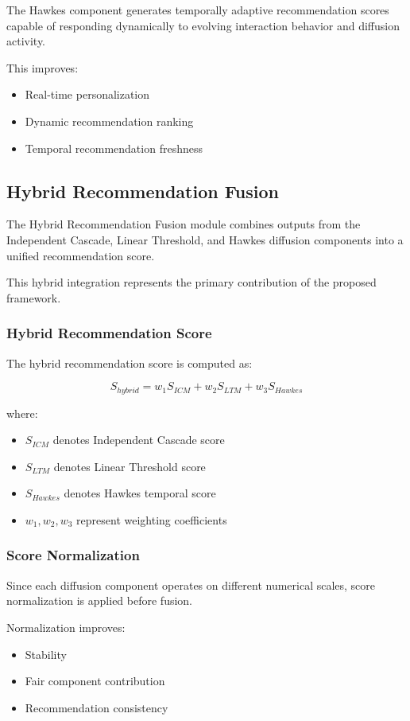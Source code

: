 \documentclass{article}
\begin{document}
The Hawkes component generates temporally adaptive recommendation scores capable of responding dynamically to evolving interaction behavior and diffusion activity.

This improves:
\begin{itemize}
\item Real-time personalization
\item Dynamic recommendation ranking
\item Temporal recommendation freshness
\end{itemize}

\subsection{Hybrid Recommendation Fusion}

The Hybrid Recommendation Fusion module combines outputs from the Independent Cascade, Linear Threshold, and Hawkes diffusion components into a unified recommendation score.

This hybrid integration represents the primary contribution of the proposed framework.

\subsubsection{Hybrid Recommendation Score}

The hybrid recommendation score is computed as:

\[
S_{hybrid}=w_1S_{ICM}+w_2S_{LTM}+w_3S_{Hawkes}
\]

where:
\begin{itemize}
\item \(S_{ICM}\) denotes Independent Cascade score
\item \(S_{LTM}\) denotes Linear Threshold score
\item \(S_{Hawkes}\) denotes Hawkes temporal score
\item \(w_1, w_2, w_3\) represent weighting coefficients
\end{itemize}


\subsubsection{Score Normalization}

Since each diffusion component operates on different numerical scales, score normalization is applied before fusion.

Normalization improves:
\begin{itemize}
\item Stability
\item Fair component contribution
\item Recommendation consistency
\end{itemize}
\end{document}

